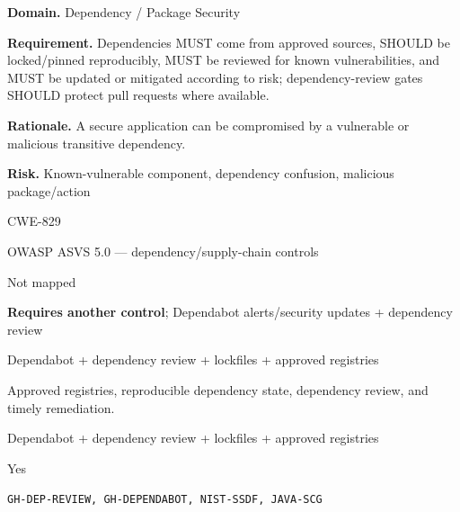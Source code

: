 \documentclass[10pt,letterpaper]{article}
\newcommand{\prioritybadge}[2]{\tcbox[on line,boxrule=0pt,arc=1.2mm,boxsep=0.7mm,left=1mm,right=1mm,top=0.4mm,bottom=0.4mm,colback=#2!12,coltext=#2]{\scriptsize\bfseries #1}}
\begin{document}
\begin{rulebox}[title={\texttt{SCS-ALL-DEP-001} \hfill \prioritybadge{Critical Control}{Critical}}]
\textbf{Domain.} Dependency / Package Security

\textbf{Requirement.} Dependencies MUST come from approved sources, SHOULD be locked/pinned reproducibly, MUST be reviewed for known vulnerabilities, and MUST be updated or mitigated according to risk; dependency-review gates SHOULD protect pull requests where available.

\textbf{Rationale.} A secure application can be compromised by a vulnerable or malicious transitive dependency.

\textbf{Risk.} Known-vulnerable component, dependency confusion, malicious package/action

\begin{description}[leftmargin=2.65cm,labelwidth=2.3cm,style=nextline,itemsep=1pt,topsep=3pt]
  \item[CWE] CWE-829
  \item[OWASP] OWASP ASVS 5.0 --- dependency/supply-chain controls
  \item[CERT] Not mapped
  \item[CodeQL] \textbf{Requires another control}; Dependabot alerts/security updates + dependency review
  \item[Enforcement] Dependabot + dependency review + lockfiles + approved registries
  \item[Prevention] Approved registries, reproducible dependency state, dependency review, and timely remediation.
  \item[Verification] Dependabot + dependency review + lockfiles + approved registries
  \item[Automation] Yes
  \item[Sources] \texttt{GH-DEP-REVIEW, GH-DEPENDABOT, NIST-SSDF, JAVA-SCG}
\end{description}
\end{rulebox}
\end{document}
